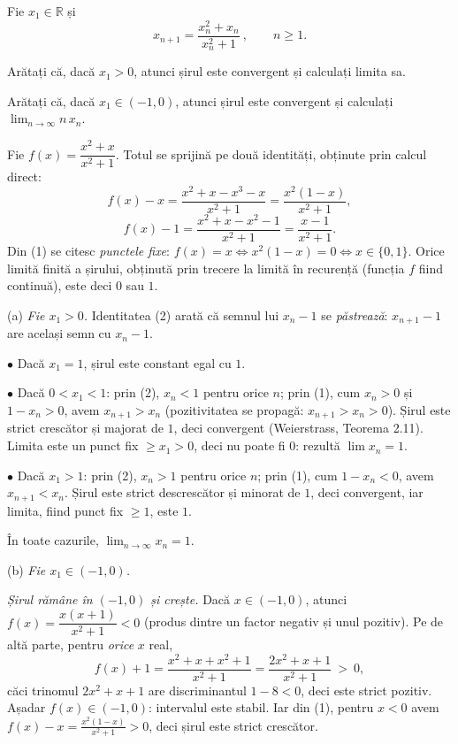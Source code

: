 Fie $x_1\in\mathbb{R}$ și
\[ x_{n+1}=\frac{x_n^{2}+x_n}{x_n^{2}+1}\ ,\qquad n\ge1 . \]
\begin{parti}
  \item Arătați că, dacă $x_1>0$, atunci șirul este convergent și calculați limita sa.
  \item Arătați că, dacă $x_1\in(-1,0)$, atunci șirul este convergent și calculați $\displaystyle\lim_{n\to\infty}n\,x_n$.
\end{parti}
\sol Fie $f(x)=\dfrac{x^{2}+x}{x^{2}+1}$. Totul se sprijină pe două identități, obținute prin calcul direct:
\[ f(x)-x=\frac{x^{2}+x-x^{3}-x}{x^{2}+1}=\frac{x^{2}(1-x)}{x^{2}+1} , \tag{1} \]
\[ f(x)-1=\frac{x^{2}+x-x^{2}-1}{x^{2}+1}=\frac{x-1}{x^{2}+1} . \tag{2} \]
Din (1) se citesc \emph{punctele fixe}: $f(x)=x\iff x^{2}(1-x)=0\iff x\in\{0,1\}$. Orice limită finită a șirului, obținută prin trecere la limită în recurență (funcția $f$ fiind continuă), este deci $0$ sau $1$.

(a) \emph{Fie $x_1>0$.} Identitatea (2) arată că semnul lui $x_n-1$ se \emph{păstrează}: $x_{n+1}-1$ are același semn cu $x_n-1$.

$\bullet$ Dacă $x_1=1$, șirul este constant egal cu $1$.

$\bullet$ Dacă $0<x_1<1$: prin (2), $x_n<1$ pentru orice $n$; prin (1), cum $x_n>0$ și $1-x_n>0$, avem $x_{n+1}>x_n$ (pozitivitatea se propagă: $x_{n+1}>x_n>0$). Șirul este strict crescător și majorat de $1$, deci convergent (Weierstrass, Teorema 2.11). Limita este un punct fix $\ge x_1>0$, deci nu poate fi $0$: rezultă $\lim x_n=1$.

$\bullet$ Dacă $x_1>1$: prin (2), $x_n>1$ pentru orice $n$; prin (1), cum $1-x_n<0$, avem $x_{n+1}<x_n$. Șirul este strict descrescător și minorat de $1$, deci convergent, iar limita, fiind punct fix $\ge1$, este $1$.

În toate cazurile, $\displaystyle\lim_{n\to\infty}x_n=1$.

(b) \emph{Fie $x_1\in(-1,0)$.}

\emph{Șirul rămâne în $(-1,0)$ și crește.} Dacă $x\in(-1,0)$, atunci $f(x)=\dfrac{x(x+1)}{x^{2}+1}<0$ (produs dintre un factor negativ și unul pozitiv). Pe de altă parte, pentru \emph{orice} $x$ real,
\[ f(x)+1=\frac{x^{2}+x+x^{2}+1}{x^{2}+1}=\frac{2x^{2}+x+1}{x^{2}+1}\ >\ 0 , \]
căci trinomul $2x^{2}+x+1$ are discriminantul $1-8<0$, deci este strict pozitiv. Așadar $f(x)\in(-1,0)$: intervalul este stabil. Iar din (1), pentru $x<0$ avem $f(x)-x=\frac{x^{2}(1-x)}{x^{2}+1}>0$, deci șirul este strict crescător.

